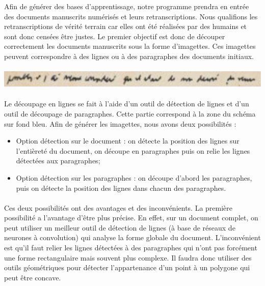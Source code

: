 Afin de générer des bases d’apprentissage, notre programme prendra en entrée des documents manuscrits
numérisés et leurs retranscriptions. Nous qualifions les retranscriptions de vérité terrain car elles
ont été réalisées par des humains et sont donc censées être justes. Le premier objectif est donc de
découper correctement les documents manuscrits sous la forme d’imagettes. Ces imagettes peuvent
correspondre à des lignes ou à des paragraphes des documents initiaux.

\paragraph{}
\begin{mdframed}[frametitle={Exemple d'imagette}, innerbottommargin=10]
\begin{center}
\includegraphics[width=\linewidth]{imagette.png}
\end{center}
\end{mdframed}

\paragraph{}
Le découpage en lignes se fait à l’aide d’un outil de détection de lignes et d’un outil de découpage de paragraphes.
Cette partie correspond à la zone du schéma sur fond bleu. Afin de générer les imagettes, nous avons deux possibilités :

\begin{itemize}
\item Option détection sur le document : on détecte la position des lignes sur l’entièreté du document,
on découpe en paragraphes puis on relie les lignes détectées aux paragraphes;

\item Option détection sur les paragraphes : on découpe d’abord les paragraphes, puis on détecte la position
des lignes dans chacun des paragraphes.
\end{itemize}

\paragraph{}
Ces deux possibilités ont des avantages et des inconvénients. La première possibilité a l’avantage d’être plus précise.
En effet, sur un document complet, on peut utiliser un meilleur outil de détection de lignes (à base de réseaux de
neurones à convolution) qui analyse la forme globale du document. L’inconvénient est qu’il faut relier les lignes
détectées à des paragraphes qui n’ont pas forcément une forme rectangulaire mais souvent plus complexe. Il faudra
donc utiliser des outils géométriques pour détecter l’appartenance d’un point à un polygone qui peut être concave.


